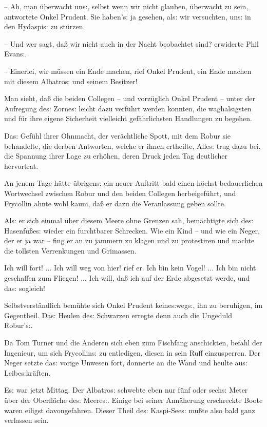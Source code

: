 \documentclass[oneside,12pt]{book}
\newcommand{\s}{s:}
\begin{document}
-- Ah, man \"uberwacht un{\s}, selbst wenn wir nicht glauben,
\"uberwacht zu sein, antwortete Onkel Prudent. Sie haben'{\s} ja
gesehen, al{\s} wir versuchten, un{\s} in den Hydaspi{\s} zu
st\"urzen.

-- Und wer sagt, da{\ss} wir nicht auch in der Nacht beobachtet sind?
erwiderte Phil Evan{\s}.

-- Einerlei, wir m\"ussen ein Ende machen, rief Onkel Prudent, ein
Ende machen mit diesem {\glqq}Albatro{\s}{\grqq} und seinem
Besitzer!{\grqq}

Man sieht, da{\ss} die beiden Collegen -- und vorz\"uglich Onkel
Prudent -- unter der Aufregung de{\s} Zorne{\s} leicht dazu
verf\"uhrt werden konnten, die waghalsigsten und f\"ur ihre eigene
Sicherheit vielleicht gef\"ahrlichsten Handlungen zu begehen.

Da{\s} Gef\"uhl ihrer Ohnmacht, der ver\"achtliche Spott, mit dem
Robur sie behandelte, die derben Antworten, welche er ihnen
ertheilte, Alle{\s} trug dazu bei, die Spannung ihrer Lage zu
erh\"ohen, deren Druck jeden Tag deutlicher hervortrat.

An jenem Tage h\"atte \"ubrigen{\s} ein neuer Auftritt bald einen
h\"ochst bedauerlichen Wortwechsel zwischen Robur und den beiden
Collegen herbeigef\"uhrt, und Frycollin ahnte wohl kaum, da{\ss} er
dazu die Veranlassung geben sollte.

Al{\s} er sich einmal \"uber diesem Meere ohne Grenzen sah,
bem\"achtigte sich de{\s} Hasenfu{\ss}e{\s} wieder ein furchtbarer
Schrecken. Wie ein Kind -- und wie ein Neger, der er ja war -- fing
er an zu jammern zu klagen und zu protestiren und machte die tollsten
Verrenkungen und Grimassen.

{\glqq}Ich will fort! ... Ich will weg von hier! rief er. Ich bin
kein Vogel! ... Ich bin nicht geschaffen zum Fliegen! ... Ich will,
da{\ss} ich auf der Erde abgesetzt werde, und da{\s} sogleich!{\grqq}

Selbstverst\"andlich bem\"uhte sich Onkel Prudent keine{\s}weg{\s},
ihn zu beruhigen, im Gegentheil. Da{\s} Heulen de{\s} Schwarzen
erregte denn auch die Ungeduld Robur'{\s}.

Da Tom Turner und die Anderen sich eben zum Fischfang anschickten,
befahl der Ingenieur, um sich Frycollin{\s} zu entledigen, diesen in
sein Ruff einzusperren. Der Neger setzte da{\s} vorige Unwesen fort,
donnerte an die Wand und heulte au{\s} Leibe{\s}kr\"aften.

E{\s} war jetzt Mittag. Der {\glqq}Albatro{\s}{\grqq} schwebte eben
nur f\"unf oder sech{\s} Meter \"uber der Oberfl\"ache de{\s}
Meere{\s}. Einige bei seiner Ann\"aherung erschreckte Boote waren
eiligst davongefahren. Dieser Theil de{\s} Kaspi-See{\s} mu{\ss}te
also bald ganz verlassen sein.
\end{document}
